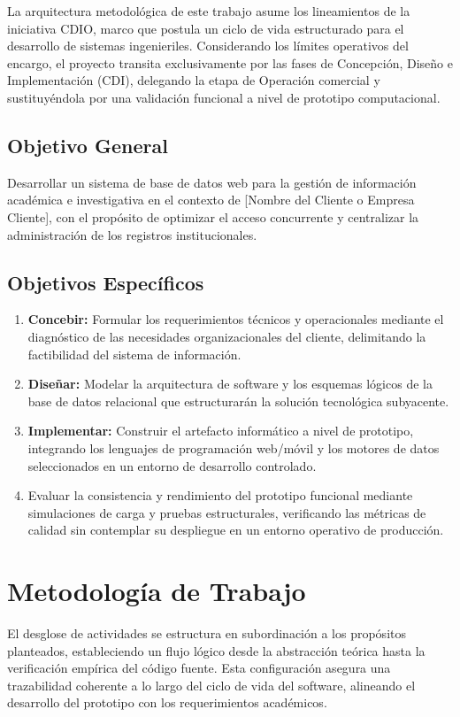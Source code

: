 La arquitectura metodológica de este trabajo asume los lineamientos de la iniciativa CDIO, marco que postula un ciclo de vida estructurado para el desarrollo de sistemas ingenieriles. Considerando los límites operativos del encargo, el proyecto transita exclusivamente por las fases de Concepción, Diseño e Implementación (CDI), delegando la etapa de Operación comercial y sustituyéndola por una validación funcional a nivel de prototipo computacional.

\subsection{Objetivo General}
Desarrollar un sistema de base de datos web para la gestión de información académica e investigativa en el contexto de [Nombre del Cliente o Empresa Cliente], con el propósito de optimizar el acceso concurrente y centralizar la administración de los registros institucionales.

\subsection{Objetivos Específicos}
\begin{enumerate}
	\item \textbf{Concebir:} Formular los requerimientos técnicos y operacionales mediante el diagnóstico de las necesidades organizacionales del cliente, delimitando la factibilidad del sistema de información.
	\item \textbf{Diseñar:} Modelar la arquitectura de software y los esquemas lógicos de la base de datos relacional que estructurarán la solución tecnológica subyacente.
	\item \textbf{Implementar:} Construir el artefacto informático a nivel de prototipo, integrando los lenguajes de programación web/móvil y los motores de datos seleccionados en un entorno de desarrollo controlado.
	\item Evaluar la consistencia y rendimiento del prototipo funcional mediante simulaciones de carga y pruebas estructurales, verificando las métricas de calidad sin contemplar su despliegue en un entorno operativo de producción.
\end{enumerate}

\section{Metodología de Trabajo}\label{sec:mettrabajo}

El desglose de actividades se estructura en subordinación a los propósitos planteados, estableciendo un flujo lógico desde la abstracción teórica hasta la verificación empírica del código fuente. Esta configuración asegura una trazabilidad coherente a lo largo del ciclo de vida del software, alineando el desarrollo del prototipo con los requerimientos académicos.

